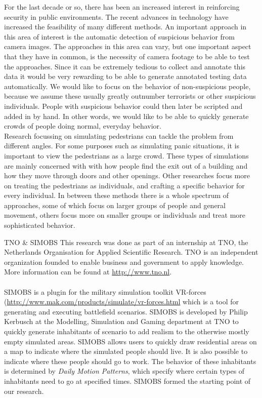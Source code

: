 \documentclass[11pt, a4paper]{book}
\begin{document}
For the last decade or so, there has been an increased interest in reinforcing security in public environments. The recent advances in technology have increased the feasibility of many different methods. An important approach in this area of interest is the automatic detection of suspicious behavior from camera images. The approaches in this area can vary, but one important aspect that they have in common, is the necessity of camera footage to be able to test the approaches. Since it can be extremely tedious to collect and annotate this data it would be very rewarding to be able to generate annotated testing data automatically. We would like to focus on the behavior of non-suspicious people, because we assume these usually greatly outnumber terrorists or other suspicious individuals. People with suspicious behavior could then later be scripted and added in by hand. In other words, we would like to be able to quickly generate crowds of people doing normal, everyday behavior.\\
Research focussing on simulating pedestrians can tackle the problem from different angles. For some purposes such as simulating panic situations, it is important to view the pedestrians as a large crowd. These types of simulations are mainly concerned with with how people find the exit out of a building and how they move through doors and other openings. Other researches focus more on treating the pedestrians as individuals, and crafting a specific behavior for every individual. In between these methods there is a whole spectrum of approaches, some of which focus on larger groups of people and general movement, others focus more on smaller groups or individuals and treat more sophisticated behavior.\\
\begin{bclogo}[logo=\bctrombone]{TNO \& SIMOBS}
This research was done as part of an internship at TNO, the Netherlands Organisation for Applied Scientific Research.  TNO is an independent organization founded to enable business and government to apply knowledge. More information can be found at \url{http://www.tno.nl}.\\\\
SIMOBS is a plugin for the military simulation toolkit VR-forces (\url{http://www.mak.com/products/simulate/vr-forces.html} which is a tool for generating and executing battlefield scenarios. SIMOBS is developed by Philip Kerbusch at the Modelling, Simulation and Gaming department at TNO to quickly generate inhabitants of scenario to add realism to the otherwise mostly empty simulated areas. SIMOBS allows users to quickly draw residential areas on a map to indicate where the simulated people should live. It is also possible to indicate where these people should go to work. The behavior of these inhabitants is determined by \emph{Daily Motion Patterns}, which specify where certain types of inhabitants need to go at specified times. SIMOBS formed the starting point of our research.
\end{bclogo}
\end{document}
